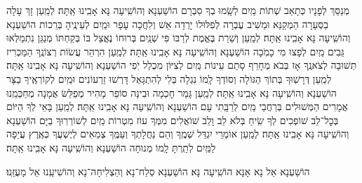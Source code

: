 \documentclass[twoside, openany, parskip=half, 11pt]{book}
\begin{document}
\begin{small}
מְנַסֵּךְ לְפָנָיו כְּתָאַב שְׁתוֹת מַֽיִם לְשָֽׂמוּ בְךָ סִבְרָם הוֹשַׁעְנָא וְהוֹשִֽׁיעָה נָּא אָבִֽינוּ אַֽתָּה׃
לְמַֽעַן זָךְ עָלָה בַסְּעָרָה הַמְקַנֵּא וּמֵשִׁיב עֶבְרָה
לְפִלּוּלוֹ יָרְדָה אֵשׁ וְלִחֲכָה עָפָר וּמַֽיִם לְעֵינֶֽיהָ בְּרֵכוֹת הוֹשַׁעְנָא וְהוֹשִֽׁיעָה נָּא אָבִֽינוּ אַֽתָּה׃
לְמַֽעַן וְשֵׁרֵת בֶּאֱמֶת לְרַבּוֹ פִּי שְׁנַֽיִם בְּרוּחוֹ נֶאֱצַל בּוֹ
בְּקַחְתּוֹ מְנַגֵּן נִתְמַלְּאוּ גֵּבִים מַֽיִם לְפָצוּ מִי כָמֹֽכָה הוֹשַׁעְנָא וְהוֹשִֽׁיעָה נָּא אָבִֽינוּ אַֽתָּה׃
לְמַֽעַן הִרְהֵר עֲשׂוֹת רְצוֹנֶֽךָ הַמַּכְרִיז תְּשׁוּבָה לְצֹאנֶֽךָ
אָז בְּבֹא מְחָרֵף סָתַם עֵינוֹת מַֽיִם לְצִיּוֹן מִכְלַל יֹֽפִי הוֹשַׁעְנָא וְהוֹשִֽׁיעָה נָּא אָבִֽינוּ אַֽתָּה׃
לְמַֽעַן דְּרָשֽׁוּךָ בְּתוֹךְ הַגּוֹלָה וְסוֹדְךָ לָֽמוֹ נִגְלָה
בְּלִי לְהִתְגָּאֵל דָּרְשׁוּ זֵרְעוֹנִים וּמַֽיִם לְקוֹרְאֶֽיךָ בַצָּר הוֹשַׁעְנָא וְהוֹשִֽׁיעָה נָּא אָבִֽינוּ אַֽתָּה׃
לְמַֽעַן גָּמַר חׇכְמָה וּבִינָה סוֹפֵר מָהִיר מְפַלֵּשׂ אֲמָנָה
מְחַכְּמֵֽנוּ אֲמָרִים הַמְּשׁוּלִים בְּרַחֲבֵי מַֽיִם לְרַבָּֽתִי עָם הוֹשַׁעְנָא וְהוֹשִֽׁיעָה נָּא אָבִֽינוּ אַֽתָּה׃
לְמַֽעַן בָּאֵי לְךָ הַיּוֹם בְּכׇל־לֵב שׁוֹפְכִים לְךָ שִֽׂיחַ בְּלֹא לֵב וָלֵב
שׁוֹאֲלִים מִמְּךָ עוֹז מִטְרוֹת מַֽיִם לְשׁוֹרְרֽוּךָ בַיָּם הוֹשַׁעְנָא וְהוֹשִֽׁיעָה נָּא אָבִֽינוּ אַֽתָּה׃
לְמַֽעַן אוֹמְרֵי יִגְדַּל שְׁמֶֽךָ וְהֵם נַחֲלָתְךָ וְעַמֶּֽךָ
צְמֵאִים לְיֶשְׁעֲךָ כְּאֶֽרֶץ עֲיֵפָה לַמַּֽיִם לְתַֽרְתָּ לָֽמוֹ מְנוּחָה הוֹשַׁעְנָא וְהוֹשִֽׁיעָה נָּא אָבִֽינוּ אַֽתָּה׃

\end{small}

\begin{large}
\shatzvkahal
הוֹשַׁעְנָא אֵל נָא אָנָּא הוֹשִֽׁיעָה נָּא׃
הוֹשַׁעְנָא סְלַח־נָא וְהַצְלִיחָה־נָא וְהוֹשִׁיעֵֽנוּ אֵל מָעֻזֵּֽנוּ׃

\end{large}
\end{document}
